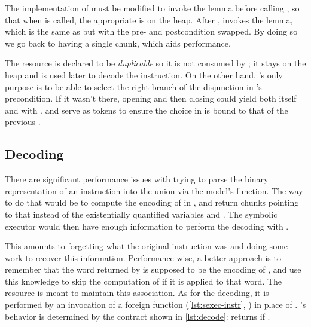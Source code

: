 The \usail implementation of  must be modified to invoke the lemma before calling , so that when  is called, the appropriate  is on the heap. After ,  invokes the  lemma, which is the same as  but with the pre- and postcondition swapped. By doing so we go back to having a single  chunk, which aids performance.

The  resource is declared to be \emph{duplicable} so it is not consumed by ; it stays on the heap and is used later to decode the instruction. On the other hand, 's only purpose is to be able to select the right branch of the disjunction in 's precondition. If it wasn't there, opening and then closing  could yield both  itself and  with .  and  serve as tokens to ensure the choice in  is bound to that of the previous .

\subsection{Decoding}

There are significant performance issues with trying to parse the binary representation of an instruction into the  union via the model's  function. The way to do that would be to compute the encoding of  in , and return  chunks pointing to that instead of the existentially quantified variables  and . The symbolic executor would then have enough information to perform the decoding with .

This amounts to forgetting what the original instruction was and doing some work to recover this information. Performance-wise, a better approach is to remember that the word returned by  is supposed to be the encoding of , and use this knowledge to skip the computation of  if it is applied to that word. The  resource is meant to maintain this association. As for the decoding, it is performed by an invocation of a foreign function  (\cref{lst:sexec-instr}, ) in place of . 's behavior is determined by the contract shown in \cref{lst:decode}:  returns  if .

